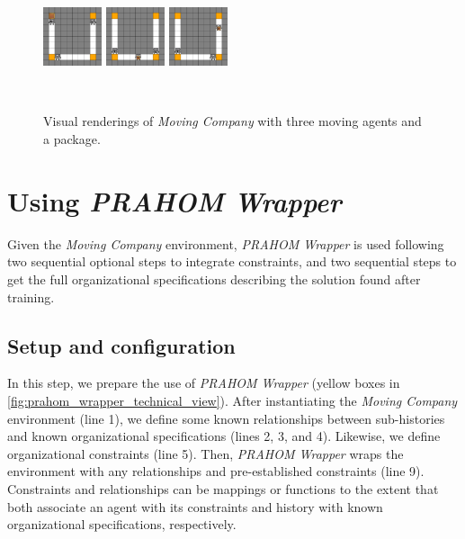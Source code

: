 \documentclass[doubleblind]{ecai}
\newcounter{relation}
\begin{document}
\begin{figure}[h!]
\centering
\includegraphics[width=0.154\textwidth]{figures/moving_company_1.png}
\includegraphics[width=0.154\textwidth]{figures/moving_company_2.png}
\includegraphics[width=0.154\textwidth]{figures/moving_company_3.png}
\caption{Visual renderings of \emph{Moving Company} with three moving agents and a package.}
\label{fig:env_moving_company}

\

\end{figure}

\section{Using \emph{PRAHOM Wrapper}}

Given the \emph{Moving Company} environment, \emph{PRAHOM Wrapper} is used following two sequential optional steps to integrate constraints, and two sequential steps to get the full organizational specifications describing the solution found after training.

\subsection{Setup and configuration}

In this step, we prepare the use of \emph{PRAHOM Wrapper} (yellow boxes in \autoref{fig:prahom_wrapper_technical_view}).
After instantiating the \emph{Moving Company} environment (line 1), we define some known relationships between sub-histories and known organizational specifications (lines 2, 3, and 4). Likewise, we define organizational constraints (line 5). Then, \emph{PRAHOM Wrapper} wraps the environment with any relationships and pre-established constraints (line 9). Constraints and relationships can be mappings or functions to the extent that both associate an agent with its constraints and history with known organizational specifications, respectively.
\end{document}
